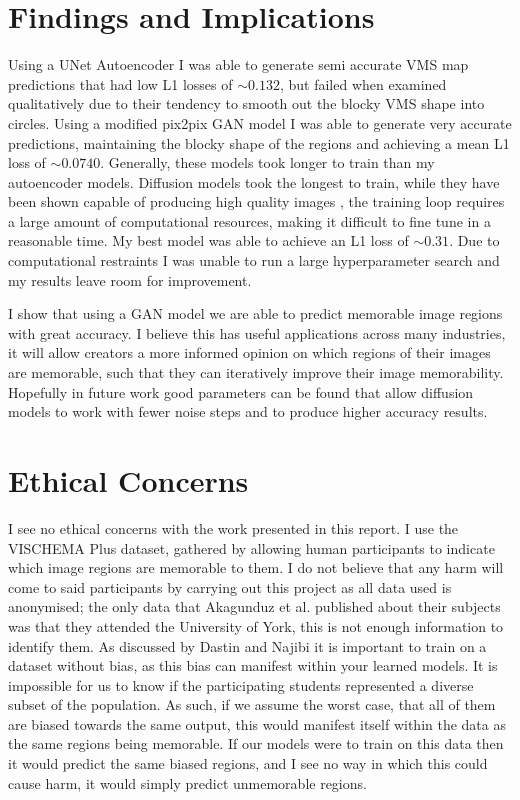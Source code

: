 \documentclass{UoYCSproject}
\begin{document}
\section{Findings and Implications}

Using a UNet Autoencoder I was able to generate semi accurate VMS map predictions that had low L1 losses of \(\sim 0.132\), but failed when examined qualitatively due to their tendency to smooth out the blocky VMS shape into circles.
Using a modified pix2pix GAN model \cite{isola2018imagetoimage} I was able to generate very accurate predictions, maintaining the blocky shape of the regions and achieving a mean L1 loss of \(\sim 0.0740\). Generally, these models took longer to train than my autoencoder models.
Diffusion models took the longest to train, while they have been shown capable of producing high quality images \cite{ramesh2022hierarchical, saharia2022photorealistic}, the training loop requires a large amount of computational resources, making it difficult to fine tune in a reasonable time. My best model was able to achieve an L1 loss of \(\sim 0.31 \). Due to computational restraints I was unable to run a large hyperparameter search and my results leave room for improvement.

I show that using a GAN model we are able to predict memorable image regions with great accuracy. I believe this has useful applications across many industries, it will allow creators a more informed opinion on which regions of their images are memorable, such that they can iteratively improve their image memorability. Hopefully in future work good parameters can be found that allow diffusion models to work with fewer noise steps and to produce higher accuracy results.

\section{Ethical Concerns}

I see no ethical concerns with the work presented in this report. I use the VISCHEMA Plus dataset, gathered by allowing human participants to indicate which image regions are memorable to them. I do not believe that any harm will come to said participants by carrying out this project as all data used is anonymised; the only data that Akagunduz et al. published about their subjects was that they attended the University of York, this is not enough information to identify them. As discussed by Dastin \cite{dastin_2018} and Najibi \cite{najibi_2020} it is important to train on a dataset without bias, as this bias can manifest within your learned models. It is impossible for us to know if the participating students represented a diverse subset of the population. As such, if we assume the worst case, that all of them are biased towards the same output, this would manifest itself within the data as the same regions being memorable. If our models were to train on this data then it would predict the same biased regions, and I see no way in which this could cause harm, it would simply predict unmemorable regions.
\end{document}
